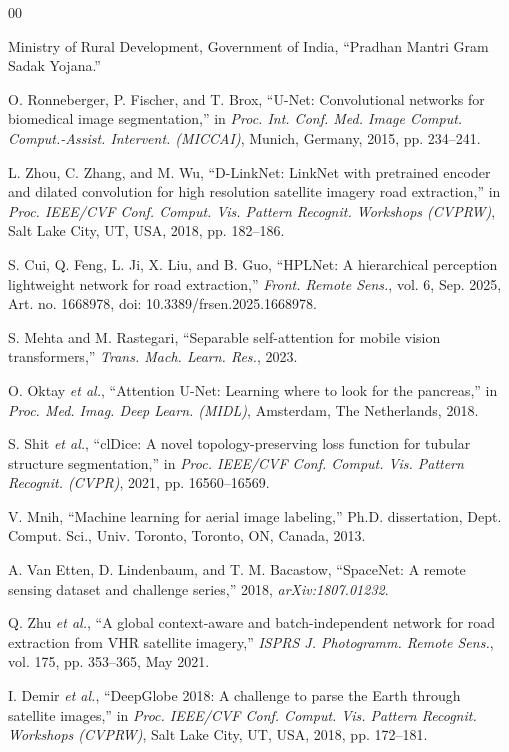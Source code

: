 \documentclass{ieeeaccess}
\begin{document}
\begin{thebibliography}{00}

Ministry of Rural Development, Government of India,
``Pradhan Mantri Gram Sadak Yojana.''

O. Ronneberger, P. Fischer, and T. Brox,
``U-Net: Convolutional networks for biomedical image segmentation,''
in \emph{Proc. Int. Conf. Med. Image Comput. Comput.-Assist. Intervent. (MICCAI)},
Munich, Germany, 2015, pp. 234--241.

L. Zhou, C. Zhang, and M. Wu,
``D-LinkNet: LinkNet with pretrained encoder and dilated convolution for high resolution satellite imagery road extraction,''
in \emph{Proc. IEEE/CVF Conf. Comput. Vis. Pattern Recognit. Workshops (CVPRW)},
Salt Lake City, UT, USA, 2018, pp. 182--186.

S. Cui, Q. Feng, L. Ji, X. Liu, and B. Guo,
``HPLNet: A hierarchical perception lightweight network for road extraction,''
\emph{Front. Remote Sens.}, vol. 6, Sep. 2025, Art. no. 1668978,
doi: 10.3389/frsen.2025.1668978.

S. Mehta and M. Rastegari,
``Separable self-attention for mobile vision transformers,''
\emph{Trans. Mach. Learn. Res.}, 2023.

O. Oktay \emph{et al.},
``Attention U-Net: Learning where to look for the pancreas,''
in \emph{Proc. Med. Imag. Deep Learn. (MIDL)},
Amsterdam, The Netherlands, 2018.

S. Shit \emph{et al.},
``clDice: A novel topology-preserving loss function for tubular structure segmentation,''
in \emph{Proc. IEEE/CVF Conf. Comput. Vis. Pattern Recognit. (CVPR)},
2021, pp. 16560--16569.

V. Mnih,
``Machine learning for aerial image labeling,''
Ph.D. dissertation, Dept. Comput. Sci., Univ. Toronto, Toronto, ON, Canada, 2013.

A. Van Etten, D. Lindenbaum, and T. M. Bacastow,
``SpaceNet: A remote sensing dataset and challenge series,''
2018, \emph{arXiv:1807.01232}.

Q. Zhu \emph{et al.},
``A global context-aware and batch-independent network for road extraction from VHR satellite imagery,''
\emph{ISPRS J. Photogramm. Remote Sens.}, vol. 175, pp. 353--365, May 2021.

I. Demir \emph{et al.},
``DeepGlobe 2018: A challenge to parse the Earth through satellite images,''
in \emph{Proc. IEEE/CVF Conf. Comput. Vis. Pattern Recognit. Workshops (CVPRW)},
Salt Lake City, UT, USA, 2018, pp. 172--181.


\end{thebibliography}
\end{document}
